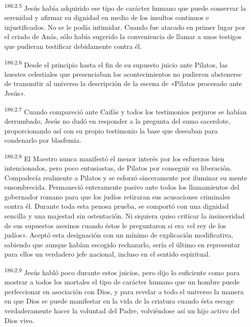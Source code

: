 \par 
\textsuperscript{186:2.5} Jesús había adquirido ese tipo de carácter humano que puede conservar la serenidad y afirmar su dignidad en medio de los insultos continuos e injustificados. No se le podía intimidar. Cuando fue atacado en primer lugar por el criado de Anás, sólo había sugerido la conveniencia de llamar a unos testigos que pudieran testificar debidamente contra él.

\par 
\textsuperscript{186:2.6} Desde el principio hasta el fin de su supuesto juicio ante Pilatos, las huestes celestiales que presenciaban los acontecimientos no pudieron abstenerse de transmitir al universo la descripción de la escena de «Pilatos procesado ante Jesús».

\par 
\textsuperscript{186:2.7} Cuando compareció ante Caifás y todos los testimonios perjuros se habían derrumbado, Jesús no dudó en responder a la pregunta del sumo sacerdote, proporcionando así con su propio testimonio la base que deseaban para condenarlo por blasfemia.

\par 
\textsuperscript{186:2.8} El Maestro nunca manifestó el menor interés por los esfuerzos bien intencionados, pero poco entusiastas, de Pilatos por conseguir su liberación. Compadecía realmente a Pilatos y se esforzó sinceramente por iluminar su mente ensombrecida. Permaneció enteramente pasivo ante todos los llamamientos del gobernador romano para que los judíos retiraran sus acusaciones criminales contra él. Durante toda esta penosa prueba, se comportó con una dignidad sencilla y una majestad sin ostentación. Ni siquiera quiso criticar la insinceridad de sus supuestos asesinos cuando éstos le preguntaron si era «el rey de los judíos». Aceptó esta designación con un mínimo de explicación modificativa, sabiendo que aunque habían escogido rechazarlo, sería el último en representar para ellos un verdadero jefe nacional, incluso en el sentido espiritual.

\par 
\textsuperscript{186:2.9} Jesús habló poco durante estos juicios, pero dijo lo suficiente como para mostrar a todos los mortales el tipo de carácter humano que un hombre puede perfeccionar en asociación con Dios, y para revelar a todo el universo la manera en que Dios se puede manifestar en la vida de la criatura cuando ésta escoge verdaderamente hacer la voluntad del Padre, volviéndose así un hijo activo del Dios vivo.

